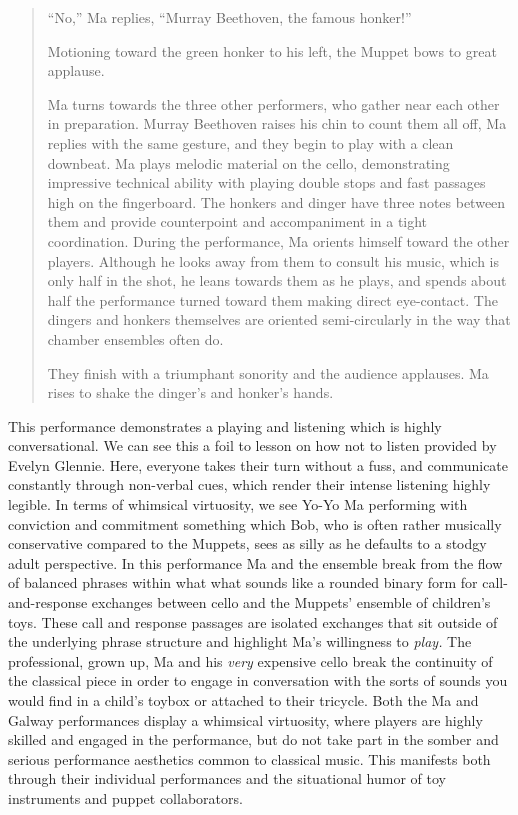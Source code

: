 \documentclass[12pt,letterpaper]{article}
\begin{document}
\begin{quote}
	``No,'' Ma replies, ``Murray Beethoven, the famous honker!''

	Motioning toward the green honker to his left, the Muppet bows to great 
	applause.

	Ma turns towards the three other performers, who gather near each other
	in preparation. Murray Beethoven raises his chin to count them all off, 
	Ma replies with the same gesture, and they begin to play with a clean 
	downbeat. Ma plays melodic material on the cello, demonstrating 
	impressive technical ability with playing double stops and fast 
	passages high on the fingerboard. The honkers and dinger have three
	notes between them and provide counterpoint and accompaniment in a tight
	coordination. During the performance, Ma orients himself toward the 
	other players. Although he looks away from them to consult his music, 
	which is only half in the shot, he leans towards them as he plays, and 
	spends about half the performance turned toward them making direct 
	eye-contact. The dingers and honkers themselves are oriented 
	semi-circularly in the way that chamber ensembles often do.

	They finish with a triumphant sonority and the audience applauses. Ma 
	rises to shake the dinger's and honker's hands.\autocite{MaHonkers} 

	\end{quote}

	This performance demonstrates a playing and listening which is highly 
	conversational. We can see this a foil to lesson on how not to listen 
	provided by Evelyn Glennie. Here, everyone takes their turn without a 
	fuss, and communicate constantly through non-verbal cues, which render 
	their intense listening highly legible. In terms of whimsical
	virtuosity, we see Yo-Yo Ma performing with conviction and commitment 
	something which Bob, who is often rather musically conservative compared
	to the Muppets, sees as silly as he defaults to a stodgy adult 
	perspective. In this performance Ma and the ensemble break from the 
	flow of balanced phrases within what what sounds like a rounded binary 
	form for call-and-response exchanges between cello and the Muppets'
	ensemble of children's toys. These call and response passages are 
	isolated exchanges that sit outside of the underlying phrase structure 
	and highlight Ma's
	willingness to \textit{play.} The professional, grown up, Ma and his
	\textit{very} expensive cello\autocites[I haven't been able to 
	find what instrument Ma was playing at the time this skit was shot in 
	1985, but the instrument that he
	famously forgot in the back of a NYC taxi a decade later was a 1733 
	Stradivarius valued
	at \$2.5 million.]{Times} break the continuity 
	of the classical piece in 
	order to engage in conversation with the sorts of sounds you would
	find in a child's toybox or attached to their tricycle. Both the Ma and
	Galway performances 
	display a whimsical virtuosity, where players are highly skilled and 
	engaged in the performance, but do not take part in the somber and 
	serious performance aesthetics common to classical music. This manifests
	both through their individual performances and the situational humor of
	toy instruments and puppet collaborators. 
\end{document}
